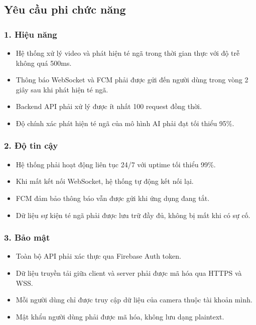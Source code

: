 \subsection{Yêu cầu phi chức năng}

\subsubsection*{1. Hiệu năng}
\begin{itemize}[leftmargin=1.5cm]
  \item Hệ thống xử lý video và phát hiện té ngã trong thời gian
        thực với độ trễ không quá 500ms.
  \item Thông báo WebSocket và FCM phải được gửi đến người dùng
        trong vòng 2 giây sau khi phát hiện té ngã.
  \item Backend API phải xử lý được ít nhất 100 request đồng thời.
  \item Độ chính xác phát hiện té ngã của mô hình AI phải đạt
        tối thiểu 95\%.
\end{itemize}

\subsubsection*{2. Độ tin cậy}
\begin{itemize}[leftmargin=1.5cm]
  \item Hệ thống phải hoạt động liên tục 24/7 với uptime tối
        thiểu 99\%.
  \item Khi mất kết nối WebSocket, hệ thống tự động kết nối lại.
  \item FCM đảm bảo thông báo vẫn được gửi khi ứng dụng đang tắt.
  \item Dữ liệu sự kiện té ngã phải được lưu trữ đầy đủ, không
        bị mất khi có sự cố.
\end{itemize}

\subsubsection*{3. Bảo mật}
\begin{itemize}[leftmargin=1.5cm]
  \item Toàn bộ API phải xác thực qua Firebase Auth token.
  \item Dữ liệu truyền tải giữa client và server phải được mã hóa
        qua HTTPS và WSS.
  \item Mỗi người dùng chỉ được truy cập dữ liệu của camera thuộc
        tài khoản mình.
  \item Mật khẩu người dùng phải được mã hóa, không lưu dạng
        plaintext.
\end{itemize}

